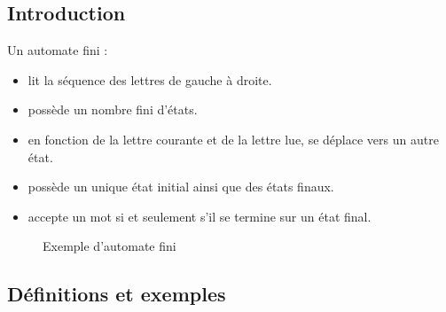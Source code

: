 \subsection{Introduction}
\label{sub:introduction}
\begin{example}
    Un automate fini :
    \begin{itemize}[label=\textbullet]
        \item lit la séquence des lettres de gauche à droite.
        \item possède un nombre fini d'états.
        \item en fonction de la lettre courante et de la lettre lue, se déplace vers un autre état.
        \item possède un unique état initial ainsi que des états finaux.
        \item accepte un mot si et seulement s'il se termine sur un état final.
    \end{itemize}
    \begin{figure}[H]
        \centering
        \caption{Exemple d'automate fini}
    \end{figure}
\end{example}

\subsection{Définitions et exemples}
\label{sub:definitions_et_exemples}

